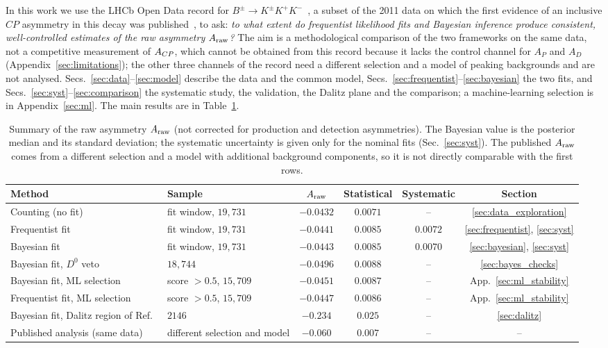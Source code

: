 In this work we use the LHCb Open Data record for $B^{\pm}\to K^{\pm}K^{+}K^{-}$~\cite{opendata_record,opendata_notebook}, a subset of the 2011 data on which the first evidence of an inclusive $CP$ asymmetry in this decay was published~\cite{lhcb_cpv_2013}, to ask: \emph{to what extent do frequentist likelihood fits and Bayesian inference produce consistent, well-controlled estimates of the raw asymmetry $A_{\mathrm{raw}}$?} The aim is a methodological comparison of the two frameworks on the same data, not a competitive measurement of $A_{CP}$, which cannot be obtained from this record because it lacks the control channel for $A_P$ and $A_D$ (Appendix~\ref{sec:limitations}); the other three channels of the record need a different selection and a model of peaking backgrounds and are not analysed. Secs.~\ref{sec:data}--\ref{sec:model} describe the data and the common model, Secs.~\ref{sec:frequentist}--\ref{sec:bayesian} the two fits, and Secs.~\ref{sec:syst}--\ref{sec:comparison} the systematic study, the validation, the Dalitz plane and the comparison; a machine-learning selection is in Appendix~\ref{sec:ml}. The main results are in Table~\ref{tab:summary}.

\begin{table}[t]
\centering
\begin{tabular}{llcccc}
\toprule
Method & Sample & $A_{\mathrm{raw}}$ & Statistical & Systematic & Section \\
\midrule
Counting (no fit) & fit window, $19{,}731$ & $-0.0432$ & $0.0071$ & -- & \ref{sec:data_exploration} \\
Frequentist fit & fit window, $19{,}731$ & $-0.0441$ & $0.0085$ & $0.0072$ & \ref{sec:frequentist}, \ref{sec:syst} \\
Bayesian fit & fit window, $19{,}731$ & $-0.0443$ & $0.0085$ & $0.0070$ & \ref{sec:bayesian}, \ref{sec:syst} \\
Bayesian fit, $D^0$ veto & $18{,}744$ & $-0.0496$ & $0.0088$ & -- & \ref{sec:bayes_checks} \\
Bayesian fit, ML selection & score $>0.5$, $15{,}709$ & $-0.0451$ & $0.0087$ & -- & App.~\ref{sec:ml_stability} \\
Frequentist fit, ML selection & score $>0.5$, $15{,}709$ & $-0.0447$ & $0.0086$ & -- & App.~\ref{sec:ml_stability} \\
Bayesian fit, Dalitz region of Ref.~\cite{lhcb_cpv_2013} & $2146$ & $-0.234$ & $0.025$ & -- & \ref{sec:dalitz} \\
\midrule
Published analysis (same data)~\cite{lhcb_cpv_2013} & different selection and model & $-0.060$ & $0.007$ & -- & -- \\
\bottomrule
\end{tabular}
\caption{Summary of the raw asymmetry $A_{\mathrm{raw}}$ (not corrected for production and detection asymmetries). The Bayesian value is the posterior median and its standard deviation; the systematic uncertainty is given only for the nominal fits (Sec.~\ref{sec:syst}). The published $A_{\mathrm{raw}}$ comes from a different selection and a model with additional background components, so it is not directly comparable with the first rows.}
\label{tab:summary}
\end{table}
